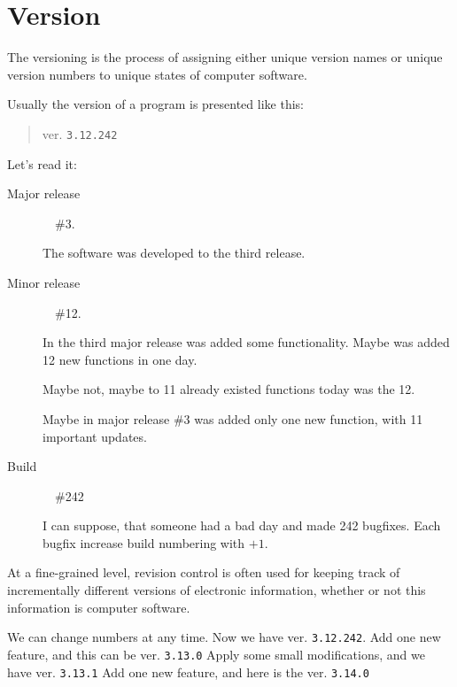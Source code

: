 \section{Version}
\label{sec:Version}

The versioning is the process of assigning either unique version names or unique version numbers to unique states of computer software. 

Usually the version of a program is presented like this: 

\begin{quote}
ver. \texttt{3.12.242}\end{quote} 

Let's read it:

\begin{description}
 \item[Major release]~\textemdash~\#3. 
 
 The software was developed to the third release.
 
 \item[Minor release]~\textemdash~\#12.
 
 In the third major release was added some functionality. Maybe was added 12 new functions in one day. 
 
 Maybe not, maybe to 11 already existed functions today was the 12. 
 
 Maybe in major release \#3 was added only one new function, with 11 important updates.

 \item[Build]~\textemdash~\#242 
 
 I can suppose, that someone had a bad day and made 242 bugfixes. Each bugfix increase build numbering with $+1$.
\end{description}

At a fine-grained level, revision control is often used for keeping track of incrementally different versions of electronic information, whether or not this information is computer software.

We can change numbers at any time. Now we have ver. \texttt{3.12.242}. Add one new feature, and this can be ver. \texttt{3.13.0} Apply some small modifications, and we have ver. \texttt{3.13.1} Add one new feature, and here is the ver. \texttt{3.14.0} 
